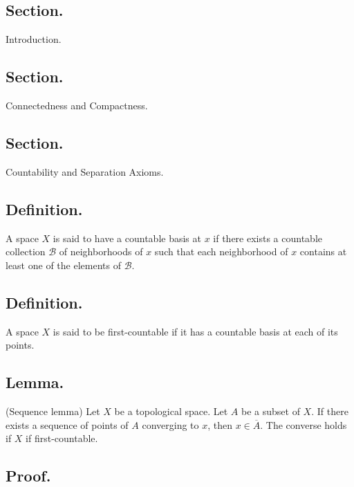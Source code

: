 \documentclass[titlepage]{article}
\begin{document}
\maketitle

\tableofcontents

\newpage {}

\subsection{Section.} Introduction.

\newpage {}

\subsection{Section.} Connectedness and Compactness.

\newpage {}

\subsection{Section.} Countability and Separation Axioms.

\subsection{Definition.} A space $X$ is said to have a countable basis at $x$ if there exists a countable collection $\mathcal{B}$ of neighborhoods of $x$ such that each neighborhood of $x$ contains at least one of the elements of $\mathcal{B}$.

\subsection{Definition.} A space $X$ is said to be first-countable if it has a countable basis at each of its points.

\subsection{Lemma.} (Sequence lemma) Let $X$ be a topological space. Let $A$ be a subset of $X$. If there exists a sequence of points of $A$ converging to $x$, then $x \in \overline{A}$. The converse holds if $X$ if first-countable.

\subsection{Proof.}
\end{document}
